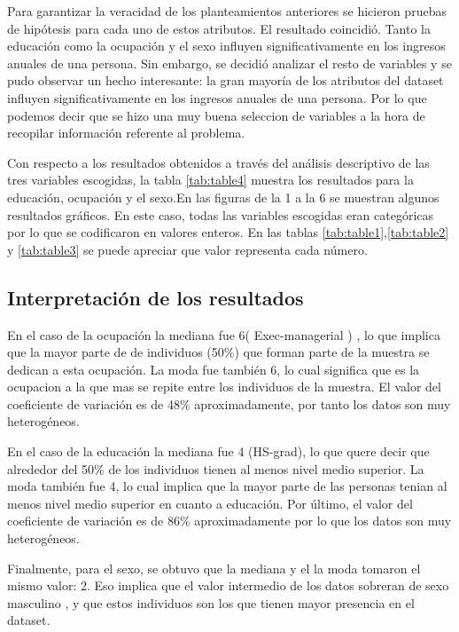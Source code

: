 \documentclass[10pt,twocolumn,a4paper]{article}
\begin{document}
Para garantizar la veracidad de los planteamientos  anteriores se hicieron pruebas de hipótesis para cada uno de estos atributos. El resultado coincidi\'o. Tanto la educación como la ocupaci\'on y el sexo influyen significativamente en los ingresos anuales de una persona. Sin embargo, se decidi\'o analizar el resto de variables y se pudo observar un hecho interesante: la gran mayor\'ia de los atributos del dataset influyen significativamente en los ingresos anuales de una persona. Por lo que podemos decir que se hizo una muy buena seleccion de variables a la hora de recopilar información referente al problema.

Con respecto a los resultados obtenidos a trav\'es del an\'alisis descriptivo de las tres variables escogidas, la tabla \ref{tab:table4} muestra los resultados para la educación, ocupaci\'on y el sexo.En las figuras de la 1 a la 6 se muestran algunos resultados gr\'aficos. En este caso, todas las variables escogidas eran categ\'oricas por lo que se codificaron en valores enteros. En las tablas \ref{tab:table1},\ref{tab:table2} y \ref{tab:table3}   se puede apreciar que valor representa cada n\'umero.

\subsection*{ Interpretaci\'on de los resultados }

En el caso de la ocupación la mediana fue 6( Exec-managerial ) , lo que implica que la mayor parte de de individuos (50\%) que forman parte de la muestra se dedican a esta ocupaci\'on. La moda fue tambi\'en 6, lo cual significa que es la ocupacion a la que mas se repite entre los individuos de la muestra. El valor del coeficiente de variaci\'on es de 48\% aproximadamente, por tanto los datos son muy heterog\'eneos. 

En el caso de la educación la mediana fue 4 (HS-grad), lo que quere decir que alrededor del 50\% de los individuos tienen al menos nivel medio superior. La moda tambi\'en fue 4, lo cual implica que la mayor parte de las personas tenian al menos nivel medio superior en cuanto a educación. Por \'ultimo, el valor del coeficiente de variaci\'on es de 86\% aproximadamente por lo que los datos son muy heterog\'eneos. 

Finalmente, para el sexo, se obtuvo  que la mediana y el la moda tomaron el mismo valor: 2. Eso implica que el valor intermedio de los datos sobreran de sexo masculino , y que  estos individuos  son los que tienen mayor presencia en el dataset.
\end{document}
